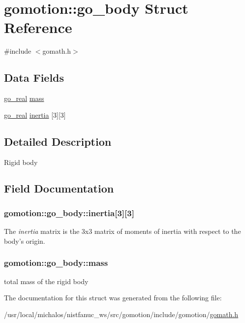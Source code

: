 \hypertarget{structgomotion_1_1go__body}{\section{gomotion\-:\-:go\-\_\-body Struct Reference}
\label{structgomotion_1_1go__body}
}


{\ttfamily \#include $<$gomath.\-h$>$}

\subsection*{Data Fields}
\begin{DoxyCompactItemize}
\item 
\hyperlink{gotypes_8h_afd666a2393eebd71ee455846ac9def9b}{go\-\_\-real} \hyperlink{structgomotion_1_1go__body_a7e58fd4b6d901ee3c81dc174aa2e7eeb}{mass}
\item 
\hyperlink{gotypes_8h_afd666a2393eebd71ee455846ac9def9b}{go\-\_\-real} \hyperlink{structgomotion_1_1go__body_a08817acb21fff36cd24ad41f2283503b}{inertia} \mbox{[}3\mbox{]}\mbox{[}3\mbox{]}
\end{DoxyCompactItemize}


\subsection{Detailed Description}
Rigid body 

\subsection{Field Documentation}
\hypertarget{structgomotion_1_1go__body_a08817acb21fff36cd24ad41f2283503b}{
\subsubsection[{inertia}]{ gomotion\-::go\-\_\-body\-::inertia\mbox{[}3\mbox{]}\mbox{[}3\mbox{]}}}\label{structgomotion_1_1go__body_a08817acb21fff36cd24ad41f2283503b}
The {\itshape inertia} matrix is the 3x3 matrix of moments of inertia with respect to the body's origin. \hypertarget{structgomotion_1_1go__body_a7e58fd4b6d901ee3c81dc174aa2e7eeb}{
\subsubsection[{mass}]{ gomotion\-::go\-\_\-body\-::mass}}\label{structgomotion_1_1go__body_a7e58fd4b6d901ee3c81dc174aa2e7eeb}
total mass of the rigid body 

The documentation for this struct was generated from the following file\-:\begin{DoxyCompactItemize}
\item 
/usr/local/michalos/nistfanuc\-\_\-ws/src/gomotion/include/gomotion/\hyperlink{gomath_8h}{gomath.\-h}\end{DoxyCompactItemize}

